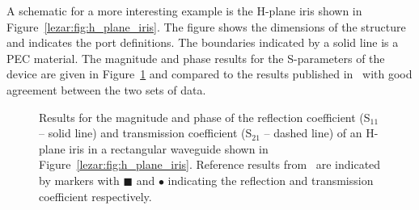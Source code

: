 A schematic for a more interesting example is the H-plane iris shown
in Figure~\ref{lezar:fig:h_plane_iris}. The figure shows the dimensions of
the structure and indicates the port definitions. The boundaries
indicated by a solid line is a PEC material. The magnitude and phase
results for the S-parameters of the device are given in
Figure~\ref{lezar:fig:h_plane_iris_S_parameters} and compared to the results
published in~\cite{PelCoc1998} with good agreement between the two
sets of data.
\begin{figure}[h]
\centering
\caption{Results for the magnitude and phase of the reflection coefficient (S$_{11}$ -- solid line) and transmission coefficient (S$_{21}$ -- dashed line) of an H-plane iris in a rectangular waveguide shown in Figure~\ref{lezar:fig:h_plane_iris}. Reference results from~\cite{PelCoc1998} are indicated by markers with $\blacksquare$ and $\bullet$ indicating the reflection and transmission coefficient respectively.}
\label{lezar:fig:h_plane_iris_S_parameters}
\end{figure}
